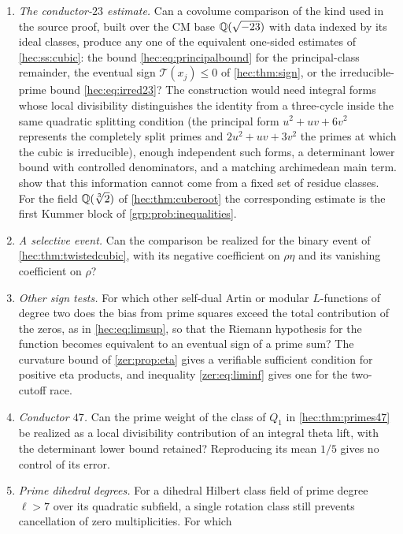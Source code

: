 \begin{enumerate}[label=\textup{(\arabic*)}]
\item \emph{The conductor-$23$ estimate.} Can a covolume comparison of the kind used in the source proof,
built over the CM base $\mathbb{Q}(\sqrt{-23})$ with data indexed by its ideal classes, produce any one of the
equivalent one-sided estimates of \cref{hec:ss:cubic}: the bound \eqref{hec:eq:principalbound} for the
principal-class remainder, the eventual sign $\mathcal T(x_j)\le0$ of \cref{hec:thm:sign}, or the
irreducible-prime bound \eqref{hec:eq:irred23}? The construction would need integral forms whose local
divisibility distinguishes the identity from a three-cycle inside the same quadratic splitting condition
(the principal form $u^2+uv+6v^2$ represents the completely split primes and $2u^2+uv+3v^2$ the primes at
which the cubic is irreducible), enough independent such forms, a determinant lower bound with controlled
denominators, and a matching archimedean main term.  show that
this information cannot come from a fixed set of residue classes. For the field $\mathbb{Q}(\sqrt[3]2)$ of
\cref{hec:thm:cuberoot} the corresponding estimate is the first Kummer block of
\cref{grp:prob:inequalities}.
\item \emph{A selective event.} Can the comparison be realized for the binary event of
\cref{hec:thm:twistedcubic}, with its negative coefficient on $\rho\eta$ and its vanishing coefficient on
$\rho$?
\item \emph{Other sign tests.} For which other self-dual Artin or modular $L$-functions of degree two does
the bias from prime squares exceed the total contribution of the zeros, as in \eqref{hec:eq:limsup}, so
that the Riemann hypothesis for the function becomes equivalent to an eventual sign of a prime sum? The
curvature bound of \cref{zer:prop:eta} gives a verifiable sufficient condition for positive eta products,
and inequality \eqref{zer:eq:liminf} gives one for the two-cutoff race.
\item \emph{Conductor $47$.} Can the prime weight of the class of $Q_1$ in \cref{hec:thm:primes47} be
realized as a local divisibility contribution of an integral theta lift, with the determinant lower bound
retained? Reproducing its mean $1/5$ gives no control of its error.
\item \emph{Prime dihedral degrees.} For a dihedral Hilbert class field of prime degree $\ell>7$ over its
quadratic subfield, a single rotation class still prevents cancellation of zero multiplicities. For which

\end{enumerate}
